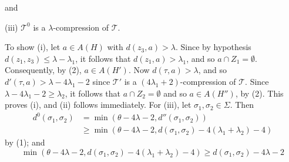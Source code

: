 and

\hspace*{12pt}(iii) $\mathscr{T}^0$ is a $\lambda$-compression of $\mathscr{T}$.

To show (i), let $a \in A(H)$ with $d(z_3, a) > \lambda$. Since by hypothesis $d(z_1, z_3) \le \lambda - \lambda_1$, it follows that $d(z_1, a) > \lambda_1$, and so $a \cap Z_1 = \emptyset$. Consequently, by (2), $a \in A(H')$. Now $d(\tau, a) > \lambda$, and so $d'(\tau, a) > \lambda - 4\lambda_1 - 2$ since $\mathscr{T}'$ is a $(4\lambda_1 + 2)$-compression of $\mathscr{T}$. Since $\lambda - 4\lambda_1 - 2 \ge \lambda_2$, it follows that $a \cap Z_2 = \emptyset$ and so $a \in A(H'')$, by (2). This proves (i), and (ii) follows immediately. For (iii), let $\sigma_1, \sigma_2 \in \Sigma$. Then
\begin{align*}
d^0(\sigma_1, \sigma_2) &= \min(\theta - 4\lambda - 2, d''(\sigma_1, \sigma_2)) \\
&\ge \min(\theta - 4\lambda - 2, d(\sigma_1, \sigma_2) - 4(\lambda_1 + \lambda_2) - 4)
\end{align*}
by (1); and
\begin{equation*}
\min(\theta - 4\lambda - 2, d(\sigma_1, \sigma_2) - 4(\lambda_1 + \lambda_2) - 4) \ge d(\sigma_1, \sigma_2) - 4\lambda - 2
\end{equation*}
